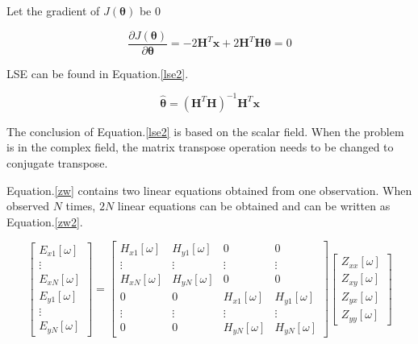 \documentclass[9pt,a4paper,twoside]{rho-class/rho}
\begin{document}
Let the gradient of $J(\bm{\theta})$ be 0

\begin{equation}
    \label{err4}
    \dfrac{\partial J(\bm{\theta})}{\partial \bm{\theta}} = -2\mathbf{H}^T\bm{x}+2\mathbf{H}^T\mathbf{H}\bm{\theta}=0
\end{equation}

LSE can be found in Equation.\eqref{lse2}. 

\begin{equation}
    \label{lse2}
    \hat{\bm{\theta}} = (\mathbf{H}^T\mathbf{H})^{-1}\mathbf{H}^T\bm{x}
\end{equation}

The conclusion of Equation.\eqref{lse2} is based on the scalar field. When the problem is in the complex field, the matrix transpose operation needs to be changed to conjugate transpose.

Equation.\eqref{zw} contains two linear equations obtained from one observation. When observed $N$ times, $2N$ linear equations can be obtained and can be written as Equation.\eqref{zw2}.

\begin{equation}
    \label{zw2}
    \begin{bmatrix}
        E_{x1}[\omega] \\
        \vdots \\
        E_{xN}[\omega] \\
        E_{y1}[\omega] \\
        \vdots \\
        E_{yN}[\omega]
    \end{bmatrix}=\begin{bmatrix}
        H_{x1}[\omega] & H_{y1}[\omega] & 0 & 0\\ 
        \vdots & \vdots & \vdots & \vdots\\
        H_{xN}[\omega] & H_{yN}[\omega] & 0 & 0\\
         0 & 0 & H_{x1}[\omega] & H_{y1}[\omega]\\
         \vdots & \vdots & \vdots & \vdots\\
         0 & 0 & H_{yN}[\omega] & H_{yN}[\omega]
    \end{bmatrix}\begin{bmatrix}
        Z_{xx}[\omega] \\
        Z_{xy}[\omega] \\
        Z_{yx}[\omega] \\
        Z_{yy}[\omega] 
    \end{bmatrix}
\end{equation}
\end{document}
